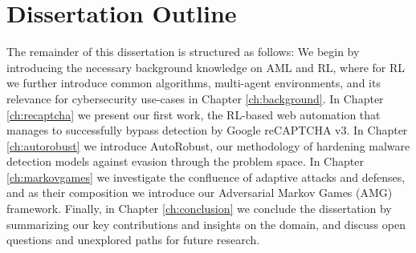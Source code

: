 


\section{Dissertation Outline}

The remainder of this dissertation is structured as follows:
We begin by introducing the necessary background knowledge on \gls{AML} and \gls{RL}, where for \gls{RL} we further introduce common algorithms, multi-agent environments, and its relevance for cybersecurity use-cases in Chapter \ref{ch:background}.
In Chapter \ref{ch:recaptcha} we present our first work, the RL-based web automation that manages to successfully bypass detection by Google reCAPTCHA v3.
In Chapter \ref{ch:autorobust} we introduce AutoRobust, our methodology of hardening malware detection models against evasion through the problem space.
In Chapter \ref{ch:markovgames} we investigate the confluence of adaptive attacks and defenses, and as their composition we introduce our Adversarial Markov Games (AMG) framework. 
Finally, in Chapter \ref{ch:conclusion} we conclude the dissertation by summarizing our key contributions and insights on the domain, and discuss open questions and unexplored paths for future research.

\cleardoublepage

